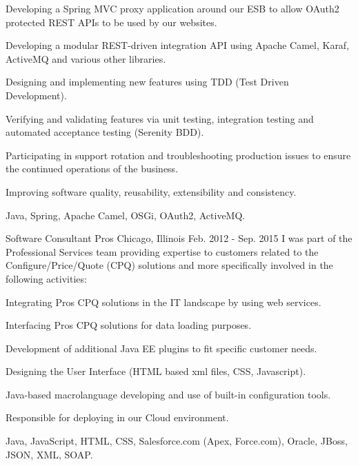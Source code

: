 \begin{cventries}
{\begin{cvitems}
  \item Developing a Spring MVC proxy application around our ESB to allow OAuth2 protected REST APIs to be used by our websites.
  \item Developing a modular REST-driven integration API using Apache Camel, Karaf, ActiveMQ and various other libraries.
  \item Designing and implementing new features using TDD (Test Driven Development).
  \item Verifying and validating features via unit testing, integration testing and automated acceptance testing (Serenity BDD).
  \item Participating in support rotation and troubleshooting production issues to ensure the continued operations of the business.
  \item Improving software quality, reusability, extensibility and consistency.
\end{cvitems}
    } %
    {Java, Spring, Apache Camel, OSGi, OAuth2, ActiveMQ.} 

  \cventryfive
    {Software Consultant} %
    {Pros} %
    {Chicago, Illinois} %
    {Feb. 2012 - Sep. 2015} %
    {I was part of the Professional Services team providing expertise to customers related to the
Configure/Price/Quote (CPQ) solutions and more specifically involved in the following activities:}
    {
      \begin{cvitems} %
        	\item Integrating Pros CPQ solutions in the IT landscape by using web services.
		\item Interfacing Pros CPQ solutions for data loading purposes.
		\item Development of additional Java EE plugins to fit specific customer needs.
    		\item Designing the User Interface (HTML based xml files, CSS, Javascript).
    		\item Java-based macrolanguage developing and use of built-in configuration tools.
    		\item Responsible for deploying in our Cloud environment.
      \end{cvitems}
    }
    {Java, JavaScript, HTML, CSS, Salesforce.com (Apex, Force.com), Oracle, JBoss, JSON, XML, SOAP.}
    

\end{cventries}
